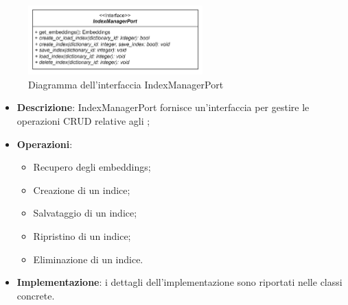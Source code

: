  \label{IndexManagerPort}
\begin{figure}[H]
    \centering
    \includegraphics[width=0.6\textwidth]{assets/Backend/index_manager_port.png}
    \caption{Diagramma dell'interfaccia IndexManagerPort}
  \end{figure}
\begin{itemize}
    \item \textbf{Descrizione}: IndexManagerPort fornisce un'interfaccia per gestire le operazioni CRUD relative agli ;
    \item \textbf{Operazioni}:
    \begin{itemize}
      \item Recupero degli embeddings;
      \item Creazione di un indice;
      \item Salvataggio di un indice;
      \item Ripristino di un indice;
      \item Eliminazione di un indice.
    \end{itemize}
    \item \textbf{Implementazione}: i dettagli dell'implementazione sono riportati nelle classi concrete.
\end{itemize} 

